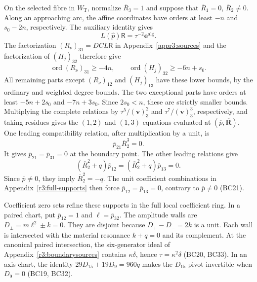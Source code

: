 \documentclass[11pt,a4paper]{article}
\numberwithin{equation}{section}
\theoremstyle{plain}
\theoremstyle{definition}
\theoremstyle{remark}
\begin{document}
On the selected fibre in $W_{\mathrm T}$, normalize
$\overline R_3=1$ and suppose that
$\overline R_1=0$, $\overline R_2\ne0$.
Along an approaching arc, the affine coordinates have orders at least
$-n$ and $s_0-2n$, respectively. The auxiliary identity gives
\[
 L(\widehat p)\mathsf R
      =\tau^{-2}\boldsymbol e^{\mathrm{alg}}.
\]
The factorization $(R_\nu)_{31}=DC L\mathsf R$ in
Appendix~\ref{appr3:sources} and the factorization of $(H_j)_{32}$
therefore give
\[
 \operatorname{ord}(R_\nu)_{31}\ge-4n,\qquad
 \operatorname{ord}(H_j)_{32}\ge-6n+s_0.
\]
All remaining parts except $(R_\nu)_{12}$ and $(H_j)_{13}$ have
these lower bounds, by the ordinary and weighted degree bounds.
The two exceptional parts have orders at least $-5n+2s_0$ and
$-7n+3s_0$. Since $2s_0<n$, these are strictly smaller bounds.
Multiplying the complete relations by
$\tau^5/(\boldsymbol v)_3^2$ and $\tau^7/(\boldsymbol v)_3^3$,
respectively, and taking residues gives the $(1,2)$ and $(1,3)$
equations evaluated at $(\overline p,\overline{\boldsymbol R})$.
One leading compatibility relation, after multiplication by a unit, is
\[
 \overline p_{21}\overline R_2^3=0.
\]
It gives $\overline p_{21}=\overline p_{31}=0$ at the boundary point.
The other leading relations give
\[
 (\overline R_2^2+q)\overline p_{12}
   =(\overline R_2^2+q)\overline p_{13}=0.
\]
Since $\overline p\ne0$, they imply $\overline R_2^2=-q$.
The unit coefficient combinations in Appendix~\ref{r3:full-supports}
then force $\overline p_{12}=\overline p_{13}=0$,
contrary to $\overline p\ne0$ (BC21).

Coefficient zero sets refine these supports in the full local
coefficient ring. In a paired chart, put $\overline p_{12}=1$ and
$\ell=\overline p_{32}$.
The amplitude walls are $D_\pm=m\ell^2\pm k=0$.
They are disjoint because $D_+-D_-=2k$ is a unit. Each wall is
intersected with the material resonance $k+q=0$ and its complement.
At the canonical paired intersection, the six-generator ideal of
Appendix~\ref{r3:boundarysources} contains $\kappa\delta$, hence
$\tau=\kappa^2\delta$ (BC20, BC33). In an axis chart, the identity
$29D_{15}+19D_9=960q$ makes the $D_{15}$ pivot invertible when
$D_9=0$ (BC19, BC32).
\end{document}
